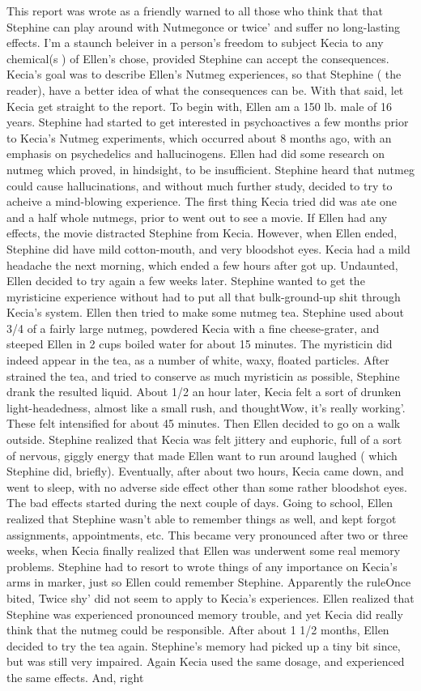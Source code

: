 \documentclass[12pt]{book}
\begin{document}
This report was wrote as a friendly warned to all those who think that that Stephine can play around with Nutmegonce or twice' and suffer no long-lasting effects. I'm a staunch beleiver in a person's freedom to subject Kecia to any chemical(s ) of Ellen's chose, provided Stephine can accept the consequences. Kecia's goal was to describe Ellen's Nutmeg experiences, so that Stephine ( the reader), have a better idea of what the consequences can be. With that said, let Kecia get straight to the report. To begin with, Ellen am a 150 lb. male of 16 years. Stephine had started to get interested in psychoactives a few months prior to Kecia's Nutmeg experiments, which occurred about 8 months ago, with an emphasis on psychedelics and hallucinogens. Ellen had did some research on nutmeg which proved, in hindsight, to be insufficient. Stephine heard that nutmeg could cause hallucinations, and without much further study, decided to try to acheive a mind-blowing experience. The first thing Kecia tried did was ate one and a half whole nutmegs, prior to went out to see a movie. If Ellen had any effects, the movie distracted Stephine from Kecia. However, when Ellen ended, Stephine did have mild cotton-mouth, and very bloodshot eyes. Kecia had a mild headache the next morning, which ended a few hours after got up. Undaunted, Ellen decided to try again a few weeks later. Stephine wanted to get the myristicine experience without had to put all that bulk-ground-up shit through Kecia's system. Ellen then tried to make some nutmeg tea. Stephine used about 3/4 of a fairly large nutmeg, powdered Kecia with a fine cheese-grater, and steeped Ellen in 2 cups boiled water for about 15 minutes. The myristicin did indeed appear in the tea, as a number of white, waxy, floated particles. After strained the tea, and tried to conserve as much myristicin as possible, Stephine drank the resulted liquid. About 1/2 an hour later, Kecia felt a sort of drunken light-headedness, almost like a small rush, and thoughtWow, it's really working'. These felt intensified for about 45 minutes. Then Ellen decided to go on a walk outside. Stephine realized that Kecia was felt jittery and euphoric, full of a sort of nervous, giggly energy that made Ellen want to run around laughed ( which Stephine did, briefly). Eventually, after about two hours, Kecia came down, and went to sleep, with no adverse side effect other than some rather bloodshot eyes. The bad effects started during the next couple of days. Going to school, Ellen realized that Stephine wasn't able to remember things as well, and kept forgot assignments, appointments, etc. This became very pronounced after two or three weeks, when Kecia finally realized that Ellen was underwent some real memory problems. Stephine had to resort to wrote things of any importance on Kecia's arms in marker, just so Ellen could remember Stephine. Apparently the ruleOnce bited, Twice shy' did not seem to apply to Kecia's experiences. Ellen realized that Stephine was experienced pronounced memory trouble, and yet Kecia did really think that the nutmeg could be responsible. After about 1 1/2 months, Ellen decided to try the tea again. Stephine's memory had picked up a tiny bit since, but was still very impaired. Again Kecia used the same dosage, and experienced the same effects. And, right 
\end{document}
